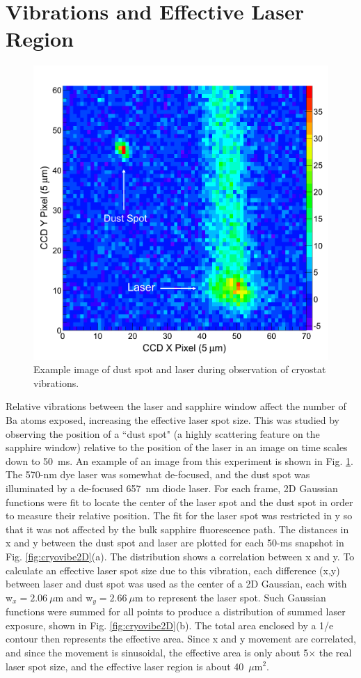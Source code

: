 \section{Vibrations and Effective Laser Region}

\begin{figure} %
        \centering
                \includegraphics[width=.6\textwidth]{figures/image_dustspot.png}
                \caption{Example image of dust spot and laser during observation of cryostat vibrations.}
\label{fig:dustspot}
\end{figure}

Relative vibrations between the laser and sapphire window affect the number of Ba atoms exposed, increasing the effective laser spot size.  This was studied by observing the position of a ``dust spot" (a highly scattering feature on the sapphire window) relative to the position of the laser in an image on time scales down to 50~ms.  An example of an image from this experiment is shown in Fig. \ref{fig:dustspot}.  The 570-nm dye laser was somewhat de-focused, and the dust spot was illuminated by a de-focused 657~nm diode laser. For each frame, 2D Gaussian functions were fit to locate the center of the laser spot and the dust spot in order to measure their relative position.  The fit for the laser spot was restricted in y so that it was not affected by the bulk sapphire fluorescence path.  The distances in x and y between the dust spot and laser are plotted for each 50-ms snapshot in Fig. \ref{fig:cryovibe2D}(a).  The distribution shows a correlation between x and y.  To calculate an effective laser spot size due to this vibration, each difference (x,y) between laser and dust spot was used as the center of a 2D Gaussian, each with w$_{x} = 2.06~\mu$m and w$_{y} = 2.66~\mu$m to represent the laser spot.  Such Gaussian functions were summed for all points to produce a distribution of summed laser exposure, shown in Fig. \ref{fig:cryovibe2D}(b).  The total area enclosed by a 1/e contour then represents the effective area.  Since x and y movement are correlated, and since the movement is sinusoidal, the effective area is only about 5$\times$ the real laser spot size, and the effective laser region is about 40~$\mu$m$^{2}$.

